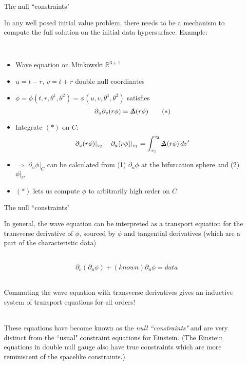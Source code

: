 \documentclass[compress,usenames,dvipsnames,8pt]{beamer}
\theoremstyle{definition}
\renewcommand{\(}{\begin{columns}}
\renewcommand{\)}{\end{columns}}
\newcommand{\<}[1]{\begin{column}{#1}}
\renewcommand{\>}{\end{column}}
\begin{document}
\begin{frame}{The null ``constraints"}

In any well posed initial value problem, there needs to be a mechanism to compute the full solution on the initial data hypersurface. \pause Example:

~\\

\begin{itemize}
\item Wave equation on  Minkowski $\mathbb R^{3+1}$ 

\item $u=t-r$, $v=t+r$ double null coordinates \pause

\item $\phi=\phi(t,r,\theta^1,\theta^2)=\phi(u,v,\theta^1,\theta^2)$ satisfies 
\begin{equation}
\partial_u \partial_v (r\phi)=\slashed\Delta(r\phi)\tag{$*$}
\end{equation}
\item \pause Integrate $(*)$ on $C$:
\[\partial_u(r\phi)|_{v_2}-\partial_u(r\phi)|_{v_1}=\int_{v_1}^{v_2} \slashed\Delta(r\phi)\,dv'\]
\item \pause $\Longrightarrow$ $\partial_u\phi|_C$ can be calculated from (1) $\partial_u \phi$ at the bifurcation sphere and (2) $\phi|_C$\pause 

\item $(*)$ lets us compute $\phi$ to arbitrarily high order on $C$

\end{itemize}

\end{frame}

\begin{frame}{The null ``constraints"}

\begin{center}
In general, the wave equation can be interpreted as a transport equation for the transverse derivative of $\phi$, sourced by $\phi$ and tangential derivatives (which are a part of the characteristic data)
\end{center} \pause

~\\

\[\partial_v\left(\partial_u \phi\right)+(known)\partial_u\phi=data\]

~\\

\pause Commuting the wave equation with transverse derivatives gives an inductive system of transport equations for all orders!

~\\

\pause These equations have become known as the \emph{null ``constraints"} and are very distinct from the ``usual" constraint equations for Einstein. 
\pause \footnotesize{(The Einstein equations in double null gauge also have true constraints which are more reminiscent of the spacelike constraints.)}

\end{frame}
\end{document}
